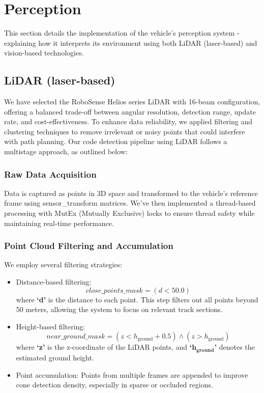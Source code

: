 \documentclass[conference]{IEEEtran}
\begin{document}
\section{Perception}
This section details the implementation of the vehicle's perception system - explaining how it interprets its environment using both LiDAR (laser-based) and vision-based technologies.

\subsection{LiDAR (laser-based)}\label{AA}
We have selected the RoboSense Helios series LiDAR with 16-beam configuration, offering a balanced trade-off between angular resolution, detection range, update rate, and cost-effectiveness. To enhance data reliability, we applied filtering and clustering techniques to remove irrelevant or noisy points that could interfere with path planning. Our code detection pipeline using LiDAR follows a multistage approach, as outlined below:
\subsubsection{Raw Data Acquisition}
Data is captured as points in 3D space and transformed to the vehicle's reference frame using sensor\_transform matrices. We've then implemented a thread-based processing with MutEx (Mutually Exclusive) locks to ensure thread safety while maintaining real-time performance.
\subsubsection{Point Cloud Filtering and Accumulation}
We employ several filtering strategies:
\begin{itemize}
    \item Distance-based filtering:
    \[
    \mathit{close\_points\_mask} = \left( d < 50.0 \right)
    \]
    where \textbf{‘d’} is the distance to each point. This step filters out all points beyond 50 meters, allowing the system to focus on relevant track sections.

    \item Height-based filtering:
    \[
    \mathit{near\_ground\_mask} = \left( z < h_{\text{ground}} + 0.5 \right) \land \left( z > h_{\text{ground}} \right)
    \]
    where \textbf{‘z’} is the z-coordinate of the LiDAR points, and \textbf{‘$\bm{h_{\text{ground}}}$’} denotes the estimated ground height.

    \item Point accumulation: Points from multiple frames are appended to improve cone detection density, especially in sparse or occluded regions.
\end{itemize}
\end{document}
